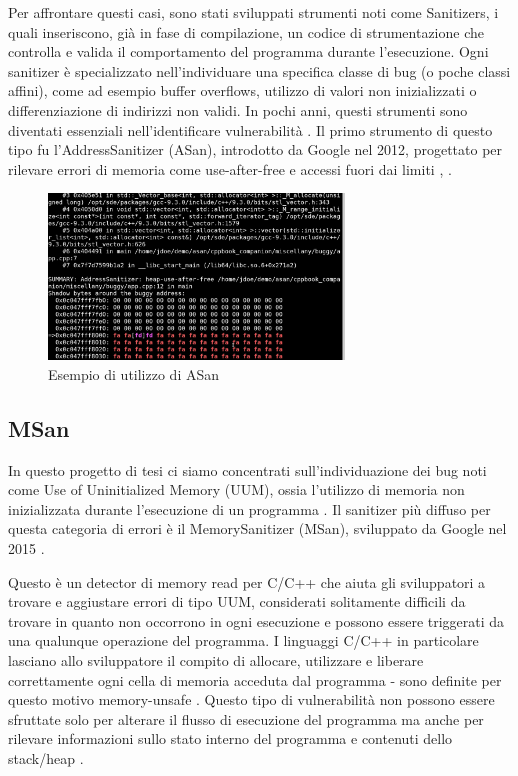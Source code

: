 Per affrontare questi casi, sono stati sviluppati strumenti noti come Sanitizers, i quali inseriscono, già in fase di compilazione, un codice di strumentazione che controlla e valida il comportamento del programma durante l’esecuzione. Ogni sanitizer è specializzato nell’individuare una specifica classe di bug (o poche classi affini), come ad esempio buffer overflows, utilizzo di valori non inizializzati o differenziazione di indirizzi non validi. In pochi anni, questi strumenti sono diventati essenziali nell’identificare vulnerabilità \cite{ref19}. Il primo strumento di questo tipo fu l’AddressSanitizer (ASan), introdotto da Google nel 2012, progettato per rilevare errori di memoria come use-after-free e accessi fuori dai limiti \cite{ref7}, \cite{ref18}. 

\begin{figure}[htbp]        
  \centering               
  \includegraphics[width=0.7\textwidth]{immagini/asan.jpg}  
  \caption{Esempio di utilizzo di ASan}  
  \label{fig:asan}      
\end{figure}

\subsection{MSan}

In questo progetto di tesi ci siamo concentrati sull’individuazione dei bug noti come Use of Uninitialized Memory (UUM),  ossia l’utilizzo di memoria non inizializzata durante l’esecuzione di un programma \cite{ref13}. Il sanitizer più diffuso per questa categoria di errori è il MemorySanitizer (MSan), sviluppato da Google nel 2015 \cite{ref8}.

Questo è un detector di memory read per C/C++ che aiuta gli sviluppatori a trovare e aggiustare errori di tipo UUM, considerati solitamente difficili da trovare in quanto non occorrono in ogni esecuzione e possono essere triggerati da una qualunque operazione del programma. I linguaggi C/C++ in particolare lasciano allo sviluppatore il compito di allocare, utilizzare e liberare correttamente ogni cella di memoria acceduta dal  programma - sono definite per questo motivo memory-unsafe \cite{ref5}. Questo tipo di vulnerabilità non possono essere sfruttate solo per alterare il flusso di esecuzione del programma ma anche per rilevare informazioni sullo stato interno del programma e contenuti dello stack/heap \cite{ref16}. 

